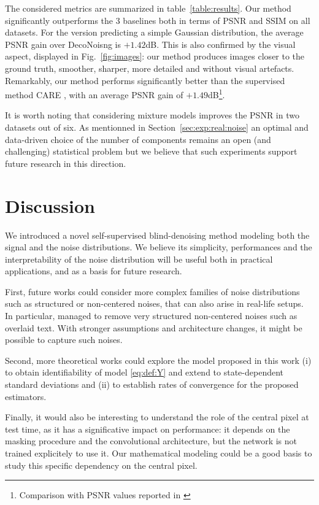 \documentclass{article}
\begin{document}
The considered metrics are summarized in table~\ref{table:results}.
Our method significantly outperforms the 3 baselines both in terms of PSNR and SSIM on all datasets.
For the version predicting a simple Gaussian distribution, the average PSNR gain over DecoNoisng is $+1.42$dB.
This is also confirmed by the visual aspect, displayed in Fig.~\ref{fig:images}: our method produces images closer to the ground truth, smoother, sharper, more detailed and without visual artefacts.
Remarkably, our method performs significantly better than the supervised method CARE \cite{weigert2017content}, with an average PSNR gain of $+1.49$dB\footnote{Comparison with PSNR values reported in \cite{goncharova2020}}.

It is worth noting that considering mixture models improves the PSNR in two datasets out of six.
As mentionned in Section~\ref{sec:exp:real:noise} an optimal and data-driven choice of the number of components remains an open (and challenging) statistical problem but we believe that such experiments support future research in this direction.

\section{Discussion}
We introduced a novel self-supervised blind-denoising method modeling both the signal and the noise distributions. We believe its simplicity, performances and the interpretability of the noise distribution will be useful both in practical applications, and as a basis for future research.

First, future works could consider more complex families of noise distributions  such as structured or non-centered noises, that can also arise in real-life setups. In particular, \cite{lehtinen2018noise2noise} managed to remove very structured non-centered noises such as overlaid text. With stronger assumptions and architecture changes, it might be possible to capture such noises.

Second, more theoretical works could explore the model proposed in this work  (i) to obtain identifiability of model \eqref{eq:def:Y} and extend \cite{gassiat:lecorff:lehericy:2021} to state-dependent standard deviations and (ii) to establish rates of convergence for the proposed estimators.

Finally, it would also be interesting to understand the role of the central pixel at test time, as it has a significative impact on performance: it depends on the  masking procedure and the convolutional architecture, but the network is not trained explicitely to use it. Our mathematical modeling could be a good basis to study this specific dependency on the central pixel.
\end{document}
